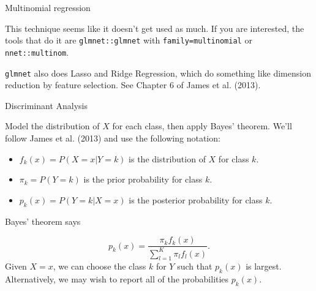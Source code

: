 \documentclass[
  ignorenonframetext,
]{beamer}
\providecommand{\tightlist}{%
  \setlength{\itemsep}{0pt}\setlength{\parskip}{0pt}}
\begin{document}
\begin{frame}[fragile]{Multinomial regression}
\protect\hypertarget{multinomial-regression}{}

This technique seems like it doesn't get used as much. If you are
interested, the tools that do it are \texttt{glmnet::glmnet} with
\texttt{family=multinomial} or \texttt{nnet::multinom}.

\texttt{glmnet} also does Lasso and Ridge Regression, which do something
like dimension reduction by feature selection. See Chapter 6 of James et
al. (2013).

\end{frame}

\begin{frame}{Discriminant Analysis}
\protect\hypertarget{discriminant-analysis}{}

Model the distribution of \(X\) for each class, then apply Bayes'
theorem. We'll follow James et al. (2013) and use the following
notation:

\begin{itemize}
\tightlist
\item
  \(f_k(x)=P(X=x|Y=k)\) is the distribution of \(X\) for class \(k\).
\item
  \(\pi_k=P(Y=k)\) is the prior probability for class \(k\).
\item
  \(p_k(x)=P(Y=k|X=x)\) is the posterior probability for class \(k\).
\end{itemize}

Bayes' theorem says

\[
p_k(x)=\frac{\pi_kf_k(x)}{\sum_{l=1}^{K}\pi_lf_l(x)}.
\] Given \(X=x\), we can choose the class \(k\) for \(Y\) such that
\(p_k(x)\) is largest. Alternatively, we may wish to report all of the
probabilities \(p_k(x)\).

\end{frame}
\end{document}
